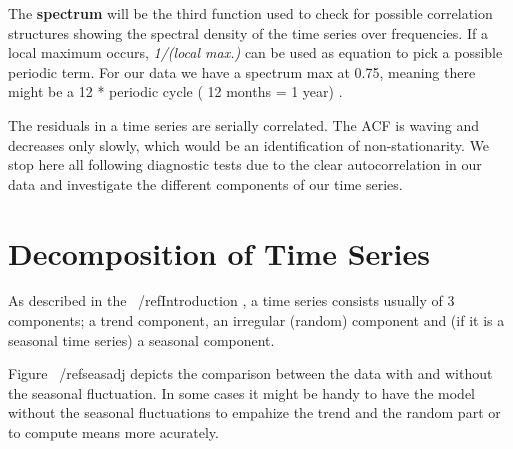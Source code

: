 \documentclass[11pt, a4paper]{article} %
\begin{document}
	The \textbf{spectrum} will be the third function used to check for possible correlation structures  showing the spectral density of the time series over frequencies. If a local maximum occurs,  \emph{1/(local max.)} can be used as equation to pick a possible periodic term. For our data we have a spectrum max at 0.75, meaning there might be a 12 * periodic cycle ( 12 months = 1 year) . 
	
	The residuals in a time series are serially correlated. The ACF is waving and decreases only slowly, which would be an identification of non-stationarity. We stop here all following diagnostic tests due to the clear autocorrelation in our data and investigate the different components of our time series. 

\section{Decomposition of Time Series}%
As described in the ~/ref{Introduction} , a time series consists usually of 3 components; a trend component, an irregular (random) component and (if it is a seasonal time series) a seasonal component. 



Figure  ~/ref{seasadj} depicts the comparison between the data with and without the seasonal fluctuation. In some cases it might be handy to have the model without the seasonal fluctuations to empahize the trend and the random part or to compute means more acurately.  
 
\end{document}
